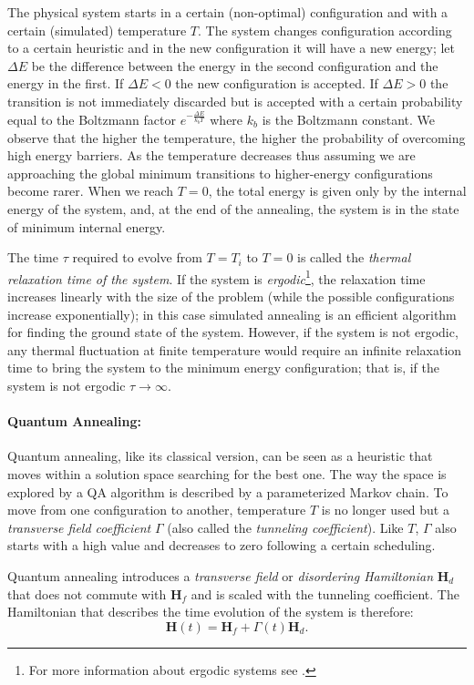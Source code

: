 The physical system starts in a certain (non-optimal) configuration and with a certain (simulated) temperature $T$. The system changes configuration according to a certain heuristic and in the new configuration it will have a new energy; let $\Delta E$ be the difference between the energy in the second configuration and the energy in the first. If $\Delta E < 0$ the new configuration is accepted. If $\Delta E > 0$ the transition is not immediately discarded but is accepted with a certain probability equal to the Boltzmann factor $e^{-\frac{\Delta E}{k_b T}}$ where $k_b$ is the Boltzmann constant. We observe that the higher the temperature, the higher the probability of overcoming high energy barriers. As the temperature decreases \textemdash{}thus assuming we are approaching the global minimum\textemdash{} transitions to higher-energy configurations become rarer. When we reach $T = 0$, the total energy is given only by the internal energy of the system, and, at the end of the annealing, the system is in the state of minimum internal energy.

The time $\tau$ required to evolve from $T = T_i$ to $T = 0$ is called the \emph{thermal relaxation time of the system}. If the system is \emph{ergodic}\footnote{For more information about ergodic systems see \cite{kim2005ergodicity}.}, the relaxation time increases linearly with the size of the problem (while the possible configurations increase exponentially); in this case simulated annealing is an efficient algorithm for finding the ground state of the system. However, if the system is not ergodic, any thermal fluctuation at finite temperature would require an infinite relaxation time to bring the system to the minimum energy configuration; that is, if the system is not ergodic $\tau \rightarrow \infty$.

\paragraph{Quantum Annealing:} Quantum annealing, like its classical version, can be seen as a heuristic that moves within a solution space searching for the best one. The way the space is explored by a QA algorithm is described by a parameterized Markov chain. To move from one configuration to another, temperature $T$ is no longer used but a \emph{transverse field coefficient} $\Gamma$ (also called the \emph{tunneling coefficient}). Like $T$, $\Gamma$ also starts with a high value and decreases to zero following a certain scheduling.

Quantum annealing introduces a \emph{transverse field} or \emph{disordering Hamiltonian} $\mathbf{H}_d$ that does not commute with $\mathbf{H}_f$ and is scaled with the tunneling coefficient. The Hamiltonian that describes the time evolution of the system is therefore:
\begin{equation}
	\mathbf{H}(t) = \mathbf{H}_f + \Gamma(t) \mathbf{H}_d.
\end{equation}

